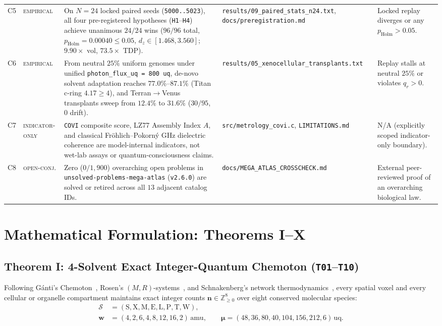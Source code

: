 \documentclass[11pt,reqno]{amsart}
\theoremstyle{plain}
\theoremstyle{definition}
\theoremstyle{remark}
\newcommand{\tcode}[1]{{\scriptsize\nolinkurl{#1}}}
\newcommand{\tagem}{\textsc{empirical}}
\newcommand{\tagio}{\textsc{indicator-only}}
\newcommand{\tagoc}{\textsc{open-conj.}}
\begin{document}
\begin{table}[ht]
\begin{tabularx}{\textwidth}{@{}P{0.50cm}P{1.95cm}YP{2.75cm}P{2.55cm}@{}}
C5 & \tagem & On $N = 24$ locked paired seeds (\tcode{5000..5023}), all four pre-registered hypotheses (\tcode{H1}--\tcode{H4}) achieve unanimous $24/24$ wins ($96/96$ total, $p_{\mathrm{Holm}} = 0.00040 \le 0.05$, $d_z \in [1.468, 3.560]$; $9.90\times$ vol, $73.5\times$ TDP). & \tcode{results/09_paired_stats_n24.txt}, \tcode{docs/preregistration.md} & Locked replay diverges or any $p_{\mathrm{Holm}} > 0.05$. \\
C6 & \tagem & From neutral $25\%$ uniform genomes under unified \tcode{photon_flux_uq = 800 uq}, de-novo solvent adaptation reaches $77.0\%\text{--}87.1\%$ (Titan c-ring $4.17 \ge 4$), and Terran$\to$Venus transplants sweep from $12.4\%$ to $31.6\%$ ($30/95$, $0$ drift). & \tcode{results/05_xenocellular_transplants.txt} & Replay stalls at neutral $25\%$ or violates $q_r > 0$. \\
C7 & \tagio & \tcode{COVI} composite score, LZ77 Assembly Index $A$, and classical Fr\"ohlich--Pokorn\'y GHz dielectric coherence are model-internal indicators, not wet-lab assays or quantum-consciousness claims. & \tcode{src/metrology_covi.c}, \tcode{LIMITATIONS.md} & N/A (explicitly scoped indicator-only boundary). \\
C8 & \tagoc & Zero ($0/1{,}900$) overarching open problems in \tcode{unsolved-problems-mega-atlas} (\tcode{v2.6.0}) are solved or retired across all $13$ adjacent catalog IDs. & \tcode{docs/MEGA_ATLAS_CROSSCHECK.md} & External peer-reviewed proof of an overarching biological law. \\
\bottomrule
\end{tabularx}
\end{table}

\section{Mathematical Formulation: Theorems I--X}
\label{sec:math}

\subsection{Theorem I: 4-Solvent Exact Integer-Quantum Chemoton (\texttt{T01}--\texttt{T10})}
Following G\'anti's Chemoton~\cite{ganti1975,ganti2003}, Rosen's $(M,R)$-systems~\cite{rosen1958}, and Schnakenberg's network thermodynamics~\cite{schnakenberg1976}, every spatial voxel and every cellular or organelle compartment maintains exact integer counts $\mathbf{n} \in \mathbb{Z}_{\ge 0}^8$ over eight conserved molecular species:
\begin{equation}
  \begin{aligned}
    \mathcal{S} &= (\mathrm{S}, \mathrm{X}, \mathrm{M}, \mathrm{E}, \mathrm{L}, \mathrm{P}, \mathrm{T}, \mathrm{W}), \\
    \mathbf{w}  &= (4, 2, 6, 4, 8, 12, 16, 2)\,\mathrm{amu}, \qquad
    \boldsymbol{\mu} = (48, 36, 80, 40, 104, 156, 212, 6)\,\mathrm{uq}.
  \end{aligned}
\end{equation}
\end{document}
